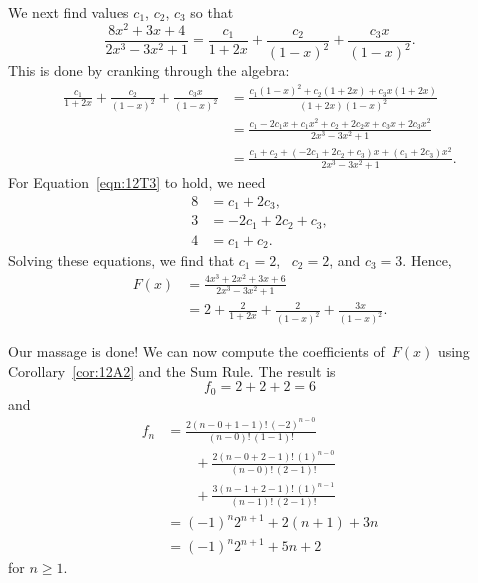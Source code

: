 We next find values $c_1$, $c_2$, $c_3$ so that
\begin{equation}\label{eqn:12T3}
\frac{ 8 x^2 + 3 x + 4 }{ 2 x^3 - 3 x^2 + 1 }
    = \frac{c_1}{1 + 2x} + \frac{c_2}{(1 - x)^2} + \frac{c_3 x}{(1 - x)^2}.
\end{equation}
This is done by cranking through the algebra:
\begingroup
\openup 3pt
\begin{align*}
\frac{c_1}{1 + 2x} + \frac{c_2}{(1 - x)^2} + \frac{c_3 x}{(1 - x)^2}
    &= \frac{c_1 (1 - x)^2 + c_2 (1 + 2x) + c_3 x (1 + 2x)}
            {(1 + 2x) (1 - x)^2} \\
    &= \frac{c_1 - 2 c_1 x + c_1 x^2 + c_2 + 2 c_2 x + c_3 x + 2 c_3 x^2}
            {2 x^3 - 3 x^2 + 1} \\
    &= \frac{c_1 + c_2 + (-2 c_1 + 2 c_2 + c_3) x + (c_1 + 2 c_3)x^2}
            {2 x^3 - 3 x^2 + 1}.
\end{align*}
\endgroup
For Equation~\ref{eqn:12T3} to hold, we need
\begin{align*}
    8 &= c_1 + 2 c_3, \\
    3 &= -2 c_1 + 2 c_2 + c_3, \\
    4 &= c_1 + c_2.
\end{align*}
Solving these equations, we find that $c_1 = 2$, \ $c_2 = 2$, and $c_3
= 3$.  Hence,
\begin{align*}
F(x)    &= \frac{ 4 x^3 + 2 x^2 + 3 x + 6 }{2 x^3 - 3 x^2 + 1} \\[2pt]
        &= 2 + \frac{2}{1 + 2x} + \frac{2}{(1 - x)^2} + \frac{3x}{(1 - x)^2}.
\end{align*}

Our massage is done!  We can now compute the coefficients of~$F(x)$
using Corollary~\ref{cor:12A2} and the Sum Rule.  The result is
\begin{equation*}
    f_0 = 2 + 2 + 2 = 6
\end{equation*}
and
\begingroup
\openup 3pt
\begin{align*}
f_n &= \frac{ 2 (n - 0 + 1 - 1)!\, (-2)^{n - 0} }{ (n - 0)! \, (1 - 1)!} \\
&\qquad + \frac{ 2 (n - 0 + 2 - 1)!\, (1)^{n - 0}  }{ (n - 0)! \, (2 - 1)!} \\
&\qquad + \frac{ 3 (n - 1 + 2 - 1)!\, (1)^{n - 1}  }{ (n - 1)! \, (2 - 1)!}\\
    &= (-1)^n 2^{n + 1} + 2 (n + 1) + 3 n \\
    &= (-1)^n 2^{n + 1} + 5 n + 2
\end{align*}
\endgroup
for $n \ge 1$.

